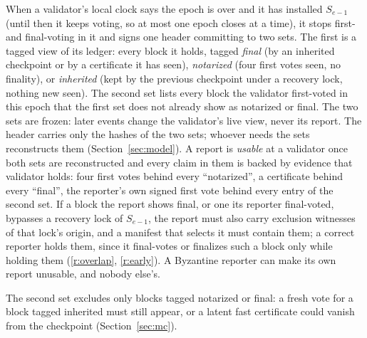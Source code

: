 When a validator's local clock says the epoch is over and it has installed $S_{e-1}$ (until then it keeps voting, so at most one epoch closes at a time), it stops first- and final-voting in it and signs one header committing to two sets. The first is a tagged view of its ledger: every block it holds, tagged \emph{final} (by an inherited checkpoint or by a certificate it has seen), \emph{notarized} (four first votes seen, no finality), or \emph{inherited} (kept by the previous checkpoint under a recovery lock, nothing new seen). The second set lists every block the validator first-voted in this epoch that the first set does not already show as notarized or final. The two sets are frozen: later events change the validator's live view, never its report. The header carries only the hashes of the two sets; whoever needs the sets reconstructs them (Section~\ref{sec:model}). A report is \emph{usable} at a validator once both sets are reconstructed and every claim in them is backed by evidence that validator holds: four first votes behind every ``notarized'', a certificate behind every ``final'', the reporter's own signed first vote behind every entry of the second set. If a block the report shows final, or one its reporter final-voted, bypasses a recovery lock of $S_{e-1}$, the report must also carry exclusion witnesses of that lock's origin, and a manifest that selects it must contain them; a correct reporter holds them, since it final-votes or finalizes such a block only while holding them (\ref{r:overlap}, \ref{r:early}). A Byzantine reporter can make its own report unusable, and nobody else's.

The second set excludes only blocks tagged notarized or final: a fresh vote for a block tagged inherited must still appear, or a latent fast certificate could vanish from the checkpoint (Section~\ref{sec:mc}).

